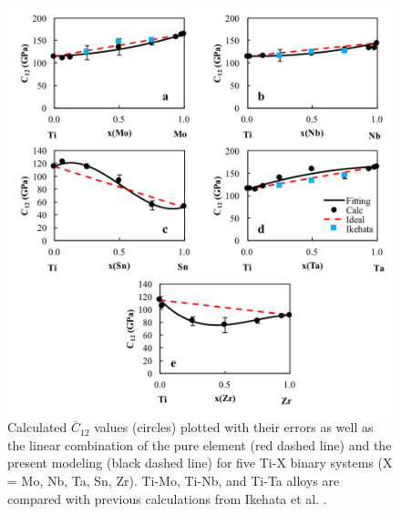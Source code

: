 \pagebreak
\begin{figure}[H]
	\centering
	\includegraphics[width=\textwidth]{Chapter-5/Figures/tixc12.png}
	\caption{Calculated $\overline{C}_{12}$ values (circles) plotted with their errors as well as the linear combination of the pure element (red dashed line) and the present modeling (black dashed line) for five Ti-X binary systems (X = Mo, Nb, Ta, Sn, Zr). Ti-Mo, Ti-Nb, and Ti-Ta alloys are compared with previous calculations from Ikehata et al. \cite{Ikehata2004}.}
	\label{Ch5-figure:tixc12}
\end{figure}

